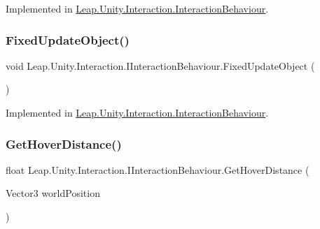 Implemented in \mbox{\hyperlink{class_leap_1_1_unity_1_1_interaction_1_1_interaction_behaviour_a9ebdb659bd6a549e89a523771458244d}{Leap.\+Unity.\+Interaction.\+Interaction\+Behaviour}}.

\mbox{\label{interface_leap_1_1_unity_1_1_interaction_1_1_i_interaction_behaviour_ad2232cd9cc106d1077778fab592f270d}} 
\subsubsection{\texorpdfstring{FixedUpdateObject()}{FixedUpdateObject()}}
{\footnotesize\ttfamily void Leap.\+Unity.\+Interaction.\+I\+Interaction\+Behaviour.\+Fixed\+Update\+Object (\begin{DoxyParamCaption}{ }\end{DoxyParamCaption})}



Implemented in \mbox{\hyperlink{class_leap_1_1_unity_1_1_interaction_1_1_interaction_behaviour_a68ff3dbe15847dceb75b97544e634a94}{Leap.\+Unity.\+Interaction.\+Interaction\+Behaviour}}.

\mbox{\label{interface_leap_1_1_unity_1_1_interaction_1_1_i_interaction_behaviour_a5f314b48c8c3b8f6f5067bcf5a97003c}} 
\subsubsection{\texorpdfstring{GetHoverDistance()}{GetHoverDistance()}}
{\footnotesize\ttfamily float Leap.\+Unity.\+Interaction.\+I\+Interaction\+Behaviour.\+Get\+Hover\+Distance (\begin{DoxyParamCaption}\item[{Vector3}]{world\+Position }\end{DoxyParamCaption})}



